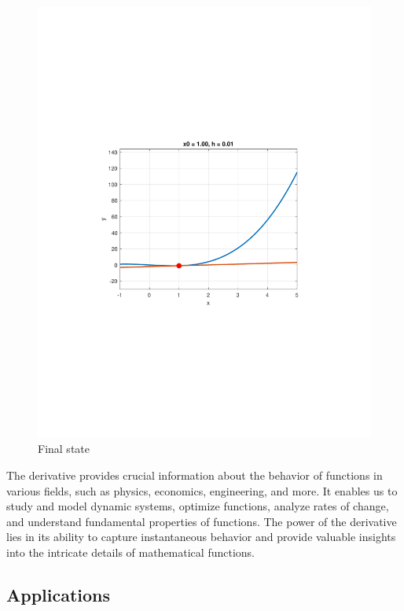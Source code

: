 \documentclass[13pt,a4paper]{report}
\begin{document}
\begin{figure}[H]
\begin{minipage}{0.45\textwidth}
        \includegraphics[trim={4.5cm 8.35cm 3.25cm 8cm},clip,scale=0.6]{pdfs/derivative_1.pdf}
        \caption{Final state}
    \end{minipage}
\end{figure}

The derivative provides crucial information about the behavior of functions in various fields, such as physics, economics, engineering, and more. It enables us to study and model dynamic systems, optimize functions, analyze rates of change, and understand fundamental properties of functions. The power of the derivative lies in its ability to capture instantaneous behavior and provide valuable insights into the intricate details of mathematical functions.

\newpage
\subsection{Applications}
\end{document}
